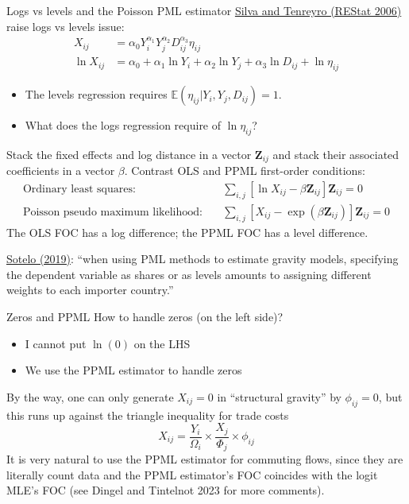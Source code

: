 \documentclass[10pt,notes=hide,aspectratio=169]{beamer}
\begin{document}
\begin{frame}{Logs vs levels and the Poisson PML estimator}
\href{https://personal.lse.ac.uk/tenreyro/LGW.html}{Silva and Tenreyro (REStat 2006)} raise logs vs levels issue:
\begin{align*}
X_{ij} &= \alpha_0 Y_i^{\alpha_1}  Y_j^{\alpha_2}  D_{ij}^{\alpha_3} \eta_{ij}
\\
\ln X_{ij} &= \alpha_0 +{\alpha_1} \ln  Y_i   +{\alpha_2}\ln  Y_j +{\alpha_3} \ln D_{ij} + \ln \eta_{ij}
\end{align*}
\vspace{-8mm}
\begin{itemize}
	\item The levels regression requires $\mathbb{E}\left(\eta_{ij}|Y_i,Y_j,D_{ij}\right)=1$.
	\item What does the logs regression require of $\ln \eta_{ij}$?
\end{itemize}
\smallskip \pause
Stack the fixed effects and log distance in a vector $\mathbf{Z}_{ij}$
and
stack their associated coefficients in a vector $\beta$.
Contrast OLS and PPML first-order conditions:
\begin{align*}
  \text{Ordinary least squares:} \quad
  &
  \sum_{i,j} \left[\ln X_{ij} - \beta \mathbf{Z}_{ij} \right] \mathbf{Z}_{ij}= 0
  \\
  \text{Poisson pseudo maximum likelihood:} \quad
  &
  \sum_{i,j} \left[X_{ij} - \exp\left(\beta \mathbf{Z}_{ij}\right)\right] \mathbf{Z}_{ij}= 0
\end{align*}
The OLS FOC has a log difference; the PPML FOC has a level difference.
{\href{http://www-personal.umich.edu/~ssotelo/research/Sotelo_MPMLE.pdf}{Sotelo (2019)}: ``when using PML methods to estimate gravity models, specifying the dependent variable as shares or as levels amounts to assigning different weights to each importer country.''\par}
\end{frame}
\begin{frame}{Zeros and PPML}
How to handle zeros (on the left side)?
\begin{itemize}
	\item I cannot put $\ln(0)$ on the LHS
	\item We use the PPML estimator to handle zeros
\end{itemize}
\medskip
By the way, one can only generate $X_{ij}=0$ in ``structural gravity'' by $\phi_{ij} = 0$, but this runs up against the triangle inequality for trade costs
\begin{equation*}
X_{ij} = {\frac{Y_i}{\Omega_i}} \times {\frac{X_j}{\Phi_j}} \times \phi_{ij}
\end{equation*}
\medskip
It is very natural to use the PPML estimator for commuting flows,
since they are literally count data and the PPML estimator's FOC coincides with the logit MLE's FOC
(see Dingel and Tintelnot 2023 for more comments).
\end{frame}
\end{document}
